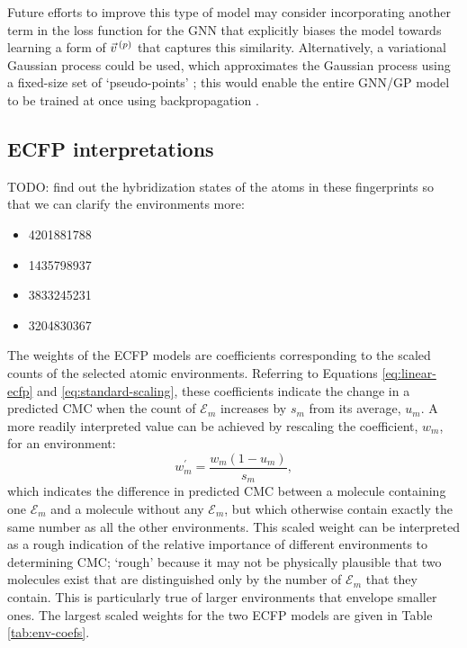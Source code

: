 Future efforts to improve this type of model may consider incorporating another term in the loss function for the GNN that explicitly biases the model towards learning a form of $\vec{v}^{\,(p)}{}$ that captures this similarity. Alternatively, a
variational Gaussian process could be used, which approximates the Gaussian process using a fixed-size set of `pseudo-points' \cite{hensmanGaussianProcessesBig2013a}; this would enable the entire GNN/GP model to be trained at once using backpropagation \cite{moriartyUnlockNNUncertaintyQuantification2022}.

\subsection{ECFP interpretations}

TODO: find out the hybridization states of the atoms in these fingerprints
so that we can clarify the environments more:
\begin{itemize}
    \item 4201881788
    \item 1435798937
    \item 3833245231
    \item 3204830367
\end{itemize}

The weights of the ECFP models are coefficients corresponding to the scaled counts of the selected atomic environments. Referring to Equations \ref{eq:linear-ecfp} and \ref{eq:standard-scaling}, these coefficients indicate
the change in a predicted CMC when the count of $\mathcal{E}_m$ increases by $s_m$ from its average, $u_m$. A more readily interpreted value can be achieved by rescaling the coefficient, $w_m$, for an environment:
\begin{equation}
    w_m^\prime = \frac{w_m(1 - u_m)}{s_m},
\end{equation}
which indicates the difference in predicted CMC between a molecule containing one $\mathcal{E}_m$ and a molecule without any $\mathcal{E}_m$, but which otherwise contain exactly the same number as all the other environments. This
scaled weight can be interpreted as a rough indication of the relative importance of different environments to determining CMC; `rough' because it may not be physically plausible that two molecules exist that are distinguished only
by the number of $\mathcal{E}_m$ that they contain. This is particularly true of larger environments that envelope smaller ones. The largest scaled weights for the two ECFP models are given in Table \ref{tab:env-coefs}.

